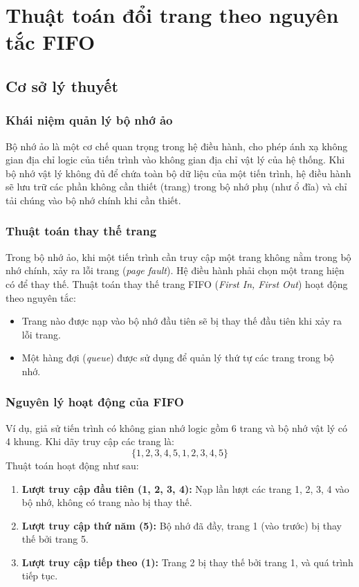\chapter{Thuật toán đổi trang theo nguyên tắc FIFO}
\label{Chapter3}

\section{Cơ sở lý thuyết}
\subsection{Khái niệm quản lý bộ nhớ ảo}
Bộ nhớ ảo là một cơ chế quan trọng trong hệ điều hành, cho phép ánh xạ không gian địa chỉ logic của tiến trình vào không gian địa chỉ vật lý của hệ thống. Khi bộ nhớ vật lý không đủ để chứa toàn bộ dữ liệu của một tiến trình, hệ điều hành sẽ lưu trữ các phần không cần thiết (trang) trong bộ nhớ phụ (như ổ đĩa) và chỉ tải chúng vào bộ nhớ chính khi cần thiết.

\subsection{Thuật toán thay thế trang}
Trong bộ nhớ ảo, khi một tiến trình cần truy cập một trang không nằm trong bộ nhớ chính, xảy ra lỗi trang (\textit{page fault}). Hệ điều hành phải chọn một trang hiện có để thay thế. Thuật toán thay thế trang FIFO (\textit{First In, First Out}) hoạt động theo nguyên tắc:
\begin{itemize}
    \item Trang nào được nạp vào bộ nhớ đầu tiên sẽ bị thay thế đầu tiên khi xảy ra lỗi trang.
    \item Một hàng đợi (\textit{queue}) được sử dụng để quản lý thứ tự các trang trong bộ nhớ.
\end{itemize}

\subsection{Nguyên lý hoạt động của FIFO}
Ví dụ, giả sử tiến trình có không gian nhớ logic gồm 6 trang và bộ nhớ vật lý có 4 khung. Khi dãy truy cập các trang là:  
\[
\{1, 2, 3, 4, 5, 1, 2, 3, 4, 5\}
\]
Thuật toán hoạt động như sau:
\begin{enumerate}
    \item \textbf{Lượt truy cập đầu tiên (1, 2, 3, 4):}  
    Nạp lần lượt các trang 1, 2, 3, 4 vào bộ nhớ, không có trang nào bị thay thế.
    \item \textbf{Lượt truy cập thứ năm (5):}  
    Bộ nhớ đã đầy, trang 1 (vào trước) bị thay thế bởi trang 5.
    \item \textbf{Lượt truy cập tiếp theo (1):}  
    Trang 2 bị thay thế bởi trang 1, và quá trình tiếp tục.
\end{enumerate}


